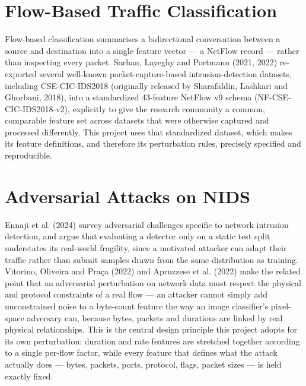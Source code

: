 \documentclass[12pt,a4paper]{report}
\begin{document}
\section{Flow-Based Traffic Classification}
Flow-based classification summarises a bidirectional conversation between a source and destination into a single feature vector --- a NetFlow record --- rather than inspecting every packet. Sarhan, Layeghy and Portmann (2021, 2022) re-exported several well-known packet-capture-based intrusion-detection datasets, including CSE-CIC-IDS2018 (originally released by Sharafaldin, Lashkari and Ghorbani, 2018), into a standardized 43-feature NetFlow v9 schema (NF-CSE-CIC-IDS2018-v2), explicitly to give the research community a common, comparable feature set across datasets that were otherwise captured and processed differently. This project uses that standardized dataset, which makes its feature definitions, and therefore its perturbation rules, precisely specified and reproducible.

\section{Adversarial Attacks on NIDS}
Ennaji et al. (2024) survey adversarial challenges specific to network intrusion detection, and argue that evaluating a detector only on a static test split understates its real-world fragility, since a motivated attacker can adapt their traffic rather than submit samples drawn from the same distribution as training. Vitorino, Oliveira and Pra\c{c}a (2022) and Apruzzese et al. (2022) make the related point that an adversarial perturbation on network data must respect the physical and protocol constraints of a real flow --- an attacker cannot simply add unconstrained noise to a byte-count feature the way an image classifier's pixel-space adversary can, because bytes, packets and durations are linked by real physical relationships. This is the central design principle this project adopts for its own perturbation: duration and rate features are stretched together according to a single per-flow factor, while every feature that defines what the attack actually does --- bytes, packets, ports, protocol, flags, packet sizes --- is held exactly fixed.
\end{document}
